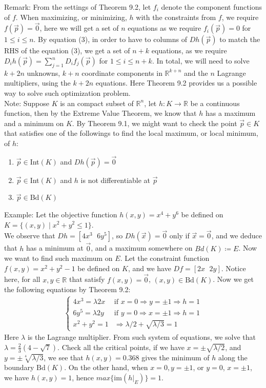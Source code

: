 \documentclass[11pt,oneside]{book}
\theoremstyle{break}
\theoremstyle{break}
\newcommand{\R}{\mathbb{R}}
\newcommand{\Bd}{\text{Bd}}
\newcommand{\note}{\color{red}Note: \color{black}}
\newcommand{\remark}{\color{blue}Remark: \color{black}}
\newcommand{\example}{\color{green}Example: \color{black}}
\begin{document}
\remark From the settings of Theorem 9.2, let $f_i$ denote the component functions of $f$. When maximizing, or minimizing, $h$ with the constraints from $f$, we require $f(\vec{p}) = \vec{0}$, here we will get a set of $n$ equations as we require $f_i(\vec{p}) = 0$ for $1\leq i \leq n$. By equation (3), in order to have to columns of $Dh(\vec{p})$ to match the RHS of the equation (3), we get a set of $n+k$ equations, as we require $D_ih(\vec{p}) = \sum_{j=1}^n D_if_j(\vec{p})$ for $1\leq i \leq n+k$. In total, we will need to solve $k+2n$ unknowns, $k+n$ coordinate components in $\R^{k+n}$ and the $n$ Lagrange multipliers, using the $k+2n$ equations. Here Theorem 9.2 provides us a possible way to solve such optimization problem.\\



\newpage
\note Suppose $K$ is an compact subset of $\R^n$, let $h: K \to \R$ be a continuous function, then by the Extreme Value Theorem, we know that $h$ has a maximum and a minimum on $K$. By Theorem 9.1, we might want to check the point $\vec{p}\in K$ that satisfies one of the followings to find the local maximum, or local minimum, of $h$:
\begin{enumerate}[topsep=3pt,itemsep=-1ex,partopsep=1ex,parsep=1ex]
\item $\vec{p} \in $Int$(K)$ and $Dh(\vec{p}) = \vec{0}$
\item $\vec{p} \in $Int$(K)$ and $h$ is not differentiable at $\vec{p}$
\item $\vec{p} \in $Bd$(K)$\\
\end{enumerate}

\example Let the objective function $h(x,y) = x^4+y^6$ be defined on $K=\{(x,y) \mid x^2+y^2 \leq 1\}$. \\We observe that $Dh= [4x^3 \ \ \, 6y^5]$, so $Dh(\vec{x}) = \vec{0}$ only if $\vec{x} = \vec{0}$, and we deduce that $h$ has a minimum at $\vec{0}$, and a maximum somewhere on $Bd(K) \coloneqq E$. Now we want to find such maximum on $E$. Let the constraint function $f(x,y) = x^2+y^2-1$ be defined on $K$, and we have $Df=[2x \ \ \, 2y]$. Notice here, for all $x,y \in \R$ that satisfy $f(x,y) = \vec{0}$, $(x,y) \in \Bd(K)$. Now we get the following equations by Theorem 9.2:
\begin{align*}
\begin{cases}
4x^3 = \lambda 2x & \text{if\ }x=0\Rightarrow y=\pm1 \Rightarrow h=1\\ 
6y^5 = \lambda 2y & \text{if\ }y=0\Rightarrow x=\pm1 \Rightarrow h=1\\ 
x^2+y^2 = 1 & \Rightarrow \lambda/2 + \sqrt{\lambda/3} = 1
\end{cases}
\end{align*}
Here $\lambda$ is the Lagrange multiplier. From such system of equations, we solve that $\lambda = \frac{2}{3}(4-\sqrt{7})$. Check all the critical points, if we have $x = \pm \sqrt{\lambda / 2}$, and $y = \pm\sqrt[4]{\lambda/3}$, we see that $h(x,y) = 0.368$ gives the minimum of $h$ along the boundary $\Bd(K)$. On the other hand, when $x=0, y=\pm1$, or $y=0$, $x=\pm1$, we have $h(x,y) = 1$, hence $max\{$im$(h|_E)\} = 1$. 
\end{document}
